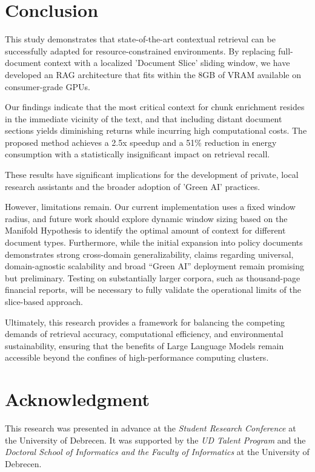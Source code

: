 \documentclass[conference]{IEEEtran}
\begin{document}
\section{Conclusion}
\label{sec:Conclusion}

This study demonstrates that state-of-the-art contextual retrieval can be successfully adapted for resource-constrained environments. By replacing full-document context with a localized 'Document Slice' sliding window, we have developed an RAG architecture that fits within the 8GB of VRAM available on consumer-grade GPUs. 

Our findings indicate that the most critical context for chunk enrichment resides in the immediate vicinity of the text, and that including distant document sections yields diminishing returns while incurring high computational costs. The proposed method achieves a 2.5x speedup and a 51\% reduction in energy consumption with a statistically insignificant impact on retrieval recall. 

These results have significant implications for the development of private, local research assistants and the broader adoption of 'Green AI' practices. 

However, limitations remain. Our current implementation uses a fixed window radius, and future work should explore dynamic window sizing based on the Manifold Hypothesis to identify the optimal amount of context for different document types. Furthermore, while the initial expansion into policy documents demonstrates strong cross-domain generalizability, claims regarding universal, domain-agnostic scalability and broad ``Green AI'' deployment remain promising but preliminary. Testing on substantially larger corpora, such as thousand-page financial reports, will be necessary to fully validate the operational limits of the slice-based approach.

Ultimately, this research provides a framework for balancing the competing demands of retrieval accuracy, computational efficiency, and environmental sustainability, ensuring that the benefits of Large Language Models remain accessible beyond the confines of high-performance computing clusters.

\section*{Acknowledgment}

This research was presented in advance at the \textit{Student Research Conference} at the University of Debrecen. It was supported by the \textit{UD Talent Program} and the \textit{Doctoral School of Informatics and the Faculty of Informatics} at the University of Debrecen.
\end{document}
